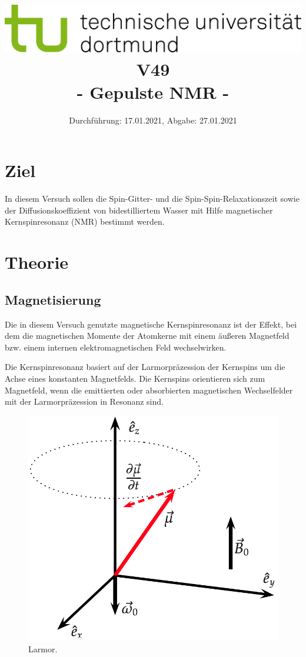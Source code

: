 
\usepackage{romannum}
\usepackage{listings}
\lstset{numbers=left, numberstyle=\tiny, numbersep=5pt}
\lstset{language=Perl}

\title{\includegraphics[scale=0.8]{../logo.jpg} \\ \vspace*{1cm} V49 \\ - Gepulste NMR -}

\date{Durchführung: 17.01.2021, Abgabe: 27.01.2021}



\maketitle

\tableofcontents
\newpage

\section{Ziel}
In diesem Versuch sollen die Spin-Gitter- und die Spin-Spin-Relaxationszeit sowie der Diffusionskoeffizient von bidestilliertem Wasser mit Hilfe magnetischer Kernspinresonanz (NMR) bestimmt werden.


\section{Theorie}
\label{sec:Theorie}

\subsection{Magnetisierung} %
Die in diesem Versuch genutzte magnetische Kernspinresonanz ist der Effekt, bei dem die magnetischen Momente der Atomkerne mit einem äußeren Magnetfeld bzw. einem internen elektromagnetischen Feld wechselwirken.

Die Kernspinresonanz basiert auf der Larmorpräzession der Kernspins um die Achse eines konstanten Magnetfelds.
Die Kernspins orientieren sich zum Magnetfeld, wenn die emittierten oder absorbierten magnetischen Wechselfelder mit der Larmorpräzession in Resonanz sind.

\begin{figure}
    \centering
    \includegraphics[width=0.4\linewidth]{./figures/larmor.png}
    \caption{Larmor.}
    \label{fig:larmor}
\end{figure}

